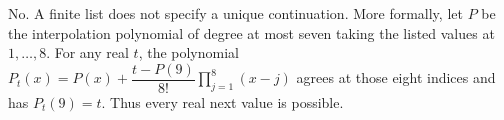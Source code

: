 No. A finite list does not specify a unique continuation. More formally, let $P$ be the interpolation polynomial of degree at most seven taking the listed values at $1,\ldots,8$. For any real $t$, the polynomial $P_t(x)=P(x)+\dfrac{t-P(9)}{8!}\prod_{j=1}^8(x-j)$ agrees at those eight indices and has $P_t(9)=t$. Thus every real next value is possible.
